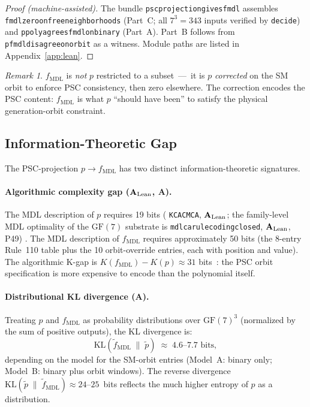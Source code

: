 \documentclass[11pt]{article}
\theoremstyle{remark}
\newtheorem{remark}[theorem]{Remark}
\newcommand{\GF}[1]{\ensuremath{\mathrm{GF}(#1)}}
\newcommand{\lean}[1]{%
  \penalty-100
  \begingroup\def\_{\textunderscore\allowbreak}\texttt{#1}\endgroup}
\newcommand{\fmdl}{\ensuremath{f_{\mathrm{MDL}}}}
\newcommand{\CatA}{\textbf{A}}
\newcommand{\CatAL}{\ensuremath{\textbf{A}_{\rm Lean}}}
\begin{document}
\begin{proof}[Proof (machine-assisted)]
The bundle \lean{psc\_projection\_gives\_fmdl} assembles
\lean{fmdl\_zero\_on\_free\_neighborhoods} (Part~C; all $7^3 = 343$
inputs verified by \texttt{decide}) and
\lean{p\_poly\_agrees\_fmdl\_on\_binary} (Part~A).
Part~B follows from \lean{p\_fmdl\_disagree\_on\_orbit} as a witness.
Module paths are listed in Appendix~\ref{app:lean}.
\end{proof}

\begin{remark}
\fmdl{} is \emph{not} $p$ restricted to a subset~---~it is $p$
\emph{corrected} on the SM orbit to enforce PSC consistency, then zero
elsewhere. The correction encodes the PSC content: \fmdl{} is what $p$
``should have been'' to satisfy the physical generation-orbit constraint.
\end{remark}

\subsection{Information-Theoretic Gap}
\label{sec:info_gap}

The PSC-projection $p \to \fmdl{}$ has two distinct information-theoretic
signatures.

\paragraph{Algorithmic complexity gap (\CatAL, \CatA{}).}
The MDL description of $p$ requires 19 bits
(\lean{K\_CA\_CMCA}, \CatAL; the family-level MDL optimality of the
$\GF{7}$ substrate is \lean{mdl\_ca\_rule\_coding\_closed}, \CatAL, P49)
\cite{SpivackGTEPolynomialWolfram}. The MDL description of \fmdl{} requires
approximately 50 bits (the 8-entry Rule~110 table plus the 10 orbit-override
entries, each with position and value). The algorithmic K-gap is
$K(\fmdl{}) - K(p) \approx 31$ bits~\cite{LiVitanyi2008,RissanenMDL}: the
PSC orbit specification is more expensive to encode than the polynomial itself.

\paragraph{Distributional KL divergence (\CatA{}).}
Treating $p$ and $\fmdl{}$ as probability distributions over $\GF{7}^3$
(normalized by the sum of positive outputs), the KL divergence is:
\begin{equation}
  \mathrm{KL}(\tilde{f}_{\mathrm{MDL}} \;\|\; \tilde{p}) \;\approx\; 4.6\text{--}7.7 \text{ bits},
\end{equation}
depending on the model for the SM-orbit entries (Model~A: binary only;
Model~B: binary plus orbit windows). The reverse divergence
$\mathrm{KL}(\tilde{p} \;\|\; \tilde{f}_{\mathrm{MDL}}) \approx 24$--$25$~bits
reflects the much higher entropy of $p$ as a distribution.
\end{document}
